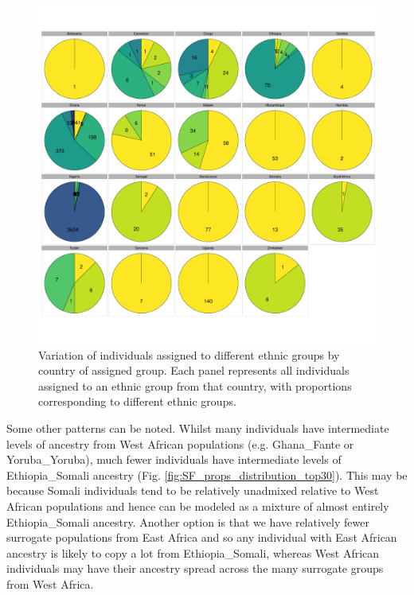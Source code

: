 \begin{figure}[htp]
    \centering
    \includegraphics[width=1.0\textwidth]{../images/chapter3/all_countries_SF_props_pie_chart.pdf}
    \caption{Variation of individuals assigned to different ethnic groups by country of assigned group. Each panel represents all individuals assigned to an ethnic group from that country, with proportions corresponding to different ethnic groups.}
    \label{fig:all_countries_SF_props_pie_chart}
\end{figure}

Some other patterns can be noted. Whilst many individuals have intermediate levels of ancestry from West African populations (e.g. Ghana\_Fante or Yoruba\_Yoruba), much fewer individuals have intermediate levels of Ethiopia\_Somali ancestry (Fig. \ref{fig:SF_props_distribution_top30}). This may be because Somali individuals tend to be relatively unadmixed relative to West African populations and hence can be modeled as a mixture of almost entirely Ethiopia\_Somali ancestry. Another option is that we have relatively fewer surrogate populations from East Africa and so any individual with East African ancestry is likely to copy a lot from Ethiopia\_Somali, whereas West African individuals may have their ancestry spread across the many surrogate groups from West Africa. 

